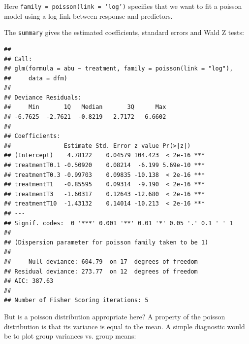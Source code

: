 Here \texttt{family = poisson(link = 'log')} specifies that we want to fit a poisson model using a log link between response and predictors.

The \texttt{summary} gives the estimated coefficients, standard errors and Wald Z tests:
\begin{knitrout}
\color{fgcolor}\small\begin{kframe}
\begin{alltt}
 \hlkwb{<-} 
\end{alltt}
\begin{verbatim}
## 
## Call:
## glm(formula = abu ~ treatment, family = poisson(link = "log"), 
##     data = dfm)
## 
## Deviance Residuals: 
##     Min       1Q   Median       3Q      Max  
## -6.7625  -2.7621  -0.8219   2.7172   6.6602  
## 
## Coefficients:
##               Estimate Std. Error z value Pr(>|z|)    
## (Intercept)    4.78122    0.04579 104.423  < 2e-16 ***
## treatmentT0.1 -0.50920    0.08214  -6.199 5.69e-10 ***
## treatmentT0.3 -0.99703    0.09835 -10.138  < 2e-16 ***
## treatmentT1   -0.85595    0.09314  -9.190  < 2e-16 ***
## treatmentT3   -1.60317    0.12643 -12.680  < 2e-16 ***
## treatmentT10  -1.43132    0.14014 -10.213  < 2e-16 ***
## ---
## Signif. codes:  0 '***' 0.001 '**' 0.01 '*' 0.05 '.' 0.1 ' ' 1
## 
## (Dispersion parameter for poisson family taken to be 1)
## 
##     Null deviance: 604.79  on 17  degrees of freedom
## Residual deviance: 273.77  on 12  degrees of freedom
## AIC: 387.63
## 
## Number of Fisher Scoring iterations: 5
\end{verbatim}
\end{kframe}
\end{knitrout}


But is a poisson distribution appropriate here? 
A property of the poisson distribution is that its variance is equal to the mean. 
A simple diagnostic would be to plot group variances vs. group means:

